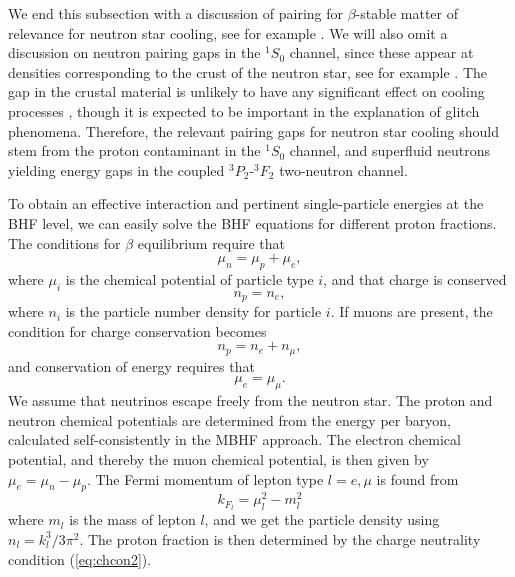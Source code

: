 \documentclass[preprint,rmp,aps,floatfix]{revtex4}
\begin{document}
We end this subsection
with a discussion of pairing for $\beta$-stable
matter of relevance for neutron star cooling, see for example 
 \cite{nstar,pethick1992}.
We will also omit a discussion on neutron pairing gaps in the
$^1S_0$ channel, since these appear at densities corresponding 
to the crust of the neutron star, see for example
\cite{barranco1997}. The gap in the crustal material 
is unlikely
to have any significant effect on cooling processes \cite{pr95}, 
though
it is expected to be important in the explanation 
of glitch phenomena.
Therefore, the relevant pairing gaps for neutron star cooling
should stem from 
the proton contaminant 
in the $^1S_0$ channel, and superfluid neutrons yielding energy gaps 
in the coupled $^3P_2$-$^3F_2$ two-neutron channel. 

To obtain an effective interaction and pertinent single-particle
energies at the BHF level, we can easily solve
the BHF equations 
for different proton fractions.
The conditions for $\beta$ equilibrium require
that 
\begin{equation}
     \mu_{n}=\mu_{p}+\mu_{e},
\end{equation}
where $\mu_i$ is the chemical potential of particle type $i$, 
and that charge is conserved
\begin{equation}
     n_{p}=n_{e},
\end{equation}
where $n_{i}$ is the particle number density for particle $i$.  If 
muons are present, the condition for charge conservation becomes 
\begin{equation}
n_{p}=n_{e}+n_{\mu},
\label{eq:chcon2}
\end{equation}
and conservation of energy requires that 
\begin{equation}
\mu_{e}=\mu_{\mu}.
\end{equation}
We assume that neutrinos escape freely from the neutron star.  
The proton and neutron chemical potentials are determined from the 
energy per baryon, calculated self-consistently in the MBHF approach.  
The electron chemical potential, and thereby the muon chemical potential, 
is then given by $\mu_{e}=\mu_{n}-\mu_{p}$.  The Fermi momentum of lepton 
type $l=e,\mu$ is found from 
\begin{equation}
k_{F_{l}}=\mu_{l}^{2}-m_{l}^{2}
\end{equation}
where $m_{l}$ is the mass of lepton $l$, and we get the particle density 
using $n_{l}=k_{l}^{3}/3\pi^{2}$.  The proton fraction is then determined 
by the charge neutrality condition (\ref{eq:chcon2}).
\end{document}
